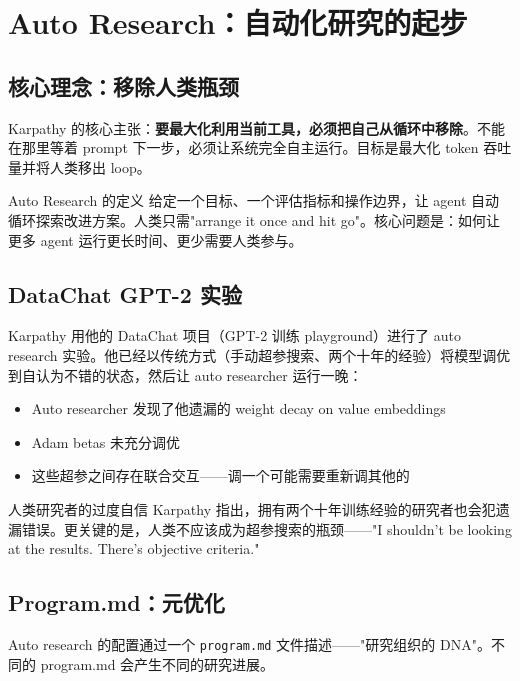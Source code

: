 \section{Auto Research：自动化研究的起步}

\subsection{核心理念：移除人类瓶颈}

Karpathy 的核心主张：\textbf{要最大化利用当前工具，必须把自己从循环中移除}。不能在那里等着 prompt 下一步，必须让系统完全自主运行。目标是最大化 token 吞吐量并将人类移出 loop。

\begin{importantbox}{Auto Research 的定义}
给定一个目标、一个评估指标和操作边界，让 agent 自动循环探索改进方案。人类只需"arrange it once and hit go"。核心问题是：如何让更多 agent 运行更长时间、更少需要人类参与。
\end{importantbox}

\subsection{DataChat GPT-2 实验}

Karpathy 用他的 DataChat 项目（GPT-2 训练 playground）进行了 auto research 实验。他已经以传统方式（手动超参搜索、两个十年的经验）将模型调优到自认为不错的状态，然后让 auto researcher 运行一晚：

\begin{itemize}
    \item Auto researcher 发现了他遗漏的 weight decay on value embeddings
    \item Adam betas 未充分调优
    \item 这些超参之间存在联合交互——调一个可能需要重新调其他的
\end{itemize}

\begin{warningbox}{人类研究者的过度自信}
Karpathy 指出，拥有两个十年训练经验的研究者也会犯遗漏错误。更关键的是，人类不应该成为超参搜索的瓶颈——"I shouldn't be looking at the results. There's objective criteria."
\end{warningbox}

\subsection{Program.md：元优化}

Auto research 的配置通过一个 \texttt{program.md} 文件描述——"研究组织的 DNA"。不同的 program.md 会产生不同的研究进展。

